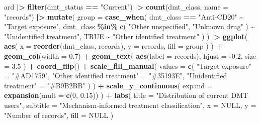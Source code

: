 \documentclass[
  british,
]{article}
\newenvironment{Shaded}{\begin{snugshade}}{\end{snugshade}}
\newcommand{\AttributeTok}[1]{\textcolor[rgb]{0.13,0.29,0.53}{#1}}
\newcommand{\ConstantTok}[1]{\textcolor[rgb]{0.56,0.35,0.01}{#1}}
\newcommand{\DecValTok}[1]{\textcolor[rgb]{0.00,0.00,0.81}{#1}}
\newcommand{\FloatTok}[1]{\textcolor[rgb]{0.00,0.00,0.81}{#1}}
\newcommand{\FunctionTok}[1]{\textcolor[rgb]{0.13,0.29,0.53}{\textbf{#1}}}
\newcommand{\NormalTok}[1]{#1}
\newcommand{\OtherTok}[1]{\textcolor[rgb]{0.56,0.35,0.01}{#1}}
\newcommand{\SpecialCharTok}[1]{\textcolor[rgb]{0.81,0.36,0.00}{\textbf{#1}}}
\newcommand{\StringTok}[1]{\textcolor[rgb]{0.31,0.60,0.02}{#1}}
\begin{document}
\begin{Shaded}
\begin{Highlighting}[]
\NormalTok{ard }\SpecialCharTok{|\textgreater{}}
  \FunctionTok{filter}\NormalTok{(dmt\_status }\SpecialCharTok{==} \StringTok{"Current"}\NormalTok{) }\SpecialCharTok{|\textgreater{}}
  \FunctionTok{count}\NormalTok{(dmt\_class, }\AttributeTok{name =} \StringTok{"records"}\NormalTok{) }\SpecialCharTok{|\textgreater{}}
  \FunctionTok{mutate}\NormalTok{(}
    \AttributeTok{group =} \FunctionTok{case\_when}\NormalTok{(}
\NormalTok{      dmt\_class }\SpecialCharTok{==} \StringTok{"Anti{-}CD20"} \SpecialCharTok{\textasciitilde{}} \StringTok{"Target exposure"}\NormalTok{,}
\NormalTok{      dmt\_class }\SpecialCharTok{\%in\%} \FunctionTok{c}\NormalTok{(}
        \StringTok{"Other unspecified"}\NormalTok{, }\StringTok{"Unknown drug"}
\NormalTok{      ) }\SpecialCharTok{\textasciitilde{}} \StringTok{"Unidentified treatment"}\NormalTok{,}
      \ConstantTok{TRUE} \SpecialCharTok{\textasciitilde{}} \StringTok{"Other identified treatment"}
\NormalTok{    )}
\NormalTok{  ) }\SpecialCharTok{|\textgreater{}}
  \FunctionTok{ggplot}\NormalTok{(}
    \FunctionTok{aes}\NormalTok{(}
      \AttributeTok{x =} \FunctionTok{reorder}\NormalTok{(dmt\_class, records),}
      \AttributeTok{y =}\NormalTok{ records,}
      \AttributeTok{fill =}\NormalTok{ group}
\NormalTok{    )}
\NormalTok{  ) }\SpecialCharTok{+}
  \FunctionTok{geom\_col}\NormalTok{(}\AttributeTok{width =} \FloatTok{0.7}\NormalTok{) }\SpecialCharTok{+}
  \FunctionTok{geom\_text}\NormalTok{(}
    \FunctionTok{aes}\NormalTok{(}\AttributeTok{label =}\NormalTok{ records),}
    \AttributeTok{hjust =} \SpecialCharTok{{-}}\FloatTok{0.2}\NormalTok{,}
    \AttributeTok{size =} \FloatTok{3.5}
\NormalTok{  ) }\SpecialCharTok{+}
  \FunctionTok{coord\_flip}\NormalTok{() }\SpecialCharTok{+}
  \FunctionTok{scale\_fill\_manual}\NormalTok{(}
    \AttributeTok{values =} \FunctionTok{c}\NormalTok{(}
      \StringTok{"Target exposure"} \OtherTok{=} \StringTok{"\#AD1759"}\NormalTok{,}
      \StringTok{"Other identified treatment"} \OtherTok{=} \StringTok{"\#35193E"}\NormalTok{,}
      \StringTok{"Unidentified treatment"} \OtherTok{=} \StringTok{"\#B9B2BB"}
\NormalTok{    )}
\NormalTok{  ) }\SpecialCharTok{+}
  \FunctionTok{scale\_y\_continuous}\NormalTok{(}
    \AttributeTok{expand =} \FunctionTok{expansion}\NormalTok{(}\AttributeTok{mult =} \FunctionTok{c}\NormalTok{(}\DecValTok{0}\NormalTok{, }\FloatTok{0.15}\NormalTok{))}
\NormalTok{  ) }\SpecialCharTok{+}
  \FunctionTok{labs}\NormalTok{(}
    \AttributeTok{title =} \StringTok{"Distribution of current DMT users"}\NormalTok{,}
    \AttributeTok{subtitle =} \StringTok{"Mechanism{-}informed treatment classification"}\NormalTok{,}
    \AttributeTok{x =} \ConstantTok{NULL}\NormalTok{,}
    \AttributeTok{y =} \StringTok{"Number of records"}\NormalTok{,}
    \AttributeTok{fill =} \ConstantTok{NULL}
\NormalTok{  )}
\end{Highlighting}
\end{Shaded}
\end{document}
